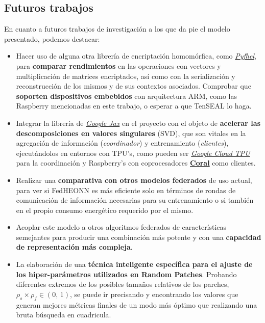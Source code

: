 \documentclass[00-Trabajo_Final.tex]{subfiles}
\begin{document}
\subsection{Futuros trabajos}
En cuanto a futuros trabajos de investigación a los que da pie el modelo presentado, podemos destacar:
\begin{itemize}[topsep=2pt, itemsep=2pt]
    \item Hacer uso de alguna otra librería de encriptación homomórfica, como \href{https://github.com/ibarrond/Pyfhel}{\textit{Pyfhel}}, para \textbf{comparar rendimientos} en las operaciones con vectores y multiplicación de matrices encriptados, así como con la serialización y reconstrucción de los mismos y de sus contextos asociados. Comprobar que \textbf{soporten dispositivos embebidos} con arquitectura ARM, como las Raspberry mencionadas en este trabajo, o esperar a que TenSEAL lo haga.
    \item Integrar la librería de \href{https://github.com/google/jax}{\textit{Google Jax}} en el proyecto con el objeto de \textbf{acelerar las descomposiciones en valores singulares} (SVD), que son vitales en la agregación de información (\textit{coordinador}) y entrenamiento (\textit{clientes}), ejecutándolos en entornos con TPU's, como pueden ser \href{https://cloud.google.com/tpu?hl=es-419}{\textit{Google Cloud TPU}} para la coordinación y Raspberry's con coprocesadores \href{https://coral.ai/products/}{\textbf{Coral}} como clientes.
    \item Realizar una \textbf{comparativa con otros modelos federados} de uso actual, para ver si FedHEONN es más eficiente solo en términos de rondas de comunicación de información necesarias para su entrenamiento o si también en el propio consumo energético requerido por el mismo.
    \item Acoplar este modelo a otros algoritmos federados de características semejantes para producir una combinación más potente y con una \textbf{capacidad de representación más compleja}.
    \item La elaboración de una \textbf{técnica inteligente específica para el ajuste de los hiper-parámetros utilizados en Random Patches}. Probando diferentes extremos de los posibles tamaños relativos de los parches, $\rho_s \times \rho_f \in (0,\,1)$, se puede ir precisando y encontrando los valores que generan mejores métricas finales de un modo más óptimo que realizando una bruta búsqueda en cuadricula.
\end{itemize}
\end{document}
